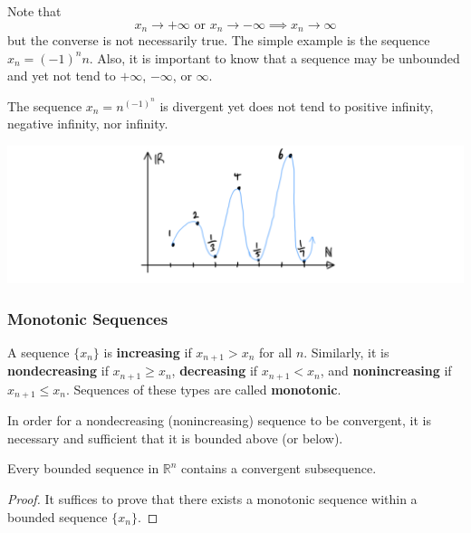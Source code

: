 \documentclass{article}
\begin{document}
      Note that 
      \[x_n \rightarrow +\infty \text{ or } x_n \rightarrow -\infty \implies x_n \rightarrow \infty\]
      but the converse is not necessarily true. The simple example is the sequence $x_n = (-1)^n n$. Also, it is important to know that a sequence may be unbounded and yet not tend to $+\infty$, $-\infty$, or $\infty$. 

      \begin{example}
        The sequence $x_n = n^{(-1)^n}$ is divergent yet does not tend to positive infinity, negative infinity, nor infinity. 
        \begin{center}
            \includegraphics[scale=0.25]{img/Neither_Divergent_Sequence.PNG}
        \end{center}
      \end{example}

    \subsubsection{Monotonic Sequences}

      \begin{definition}
        A sequence $\{x_n\}$ is \textbf{increasing} if $x_{n+1} > x_n$ for all $n$. Similarly, it is \textbf{nondecreasing} if $x_{n+1} \geq x_n$, \textbf{decreasing} if $x_{n+1} < x_n$, and \textbf{nonincreasing} if $x_{n+1} \leq x_n$. Sequences of these types are called \textbf{monotonic}. 
      \end{definition}


      \begin{lemma}
        In order for a nondecreasing (nonincreasing) sequence to be convergent, it is necessary and sufficient that it is bounded above (or below). 
      \end{lemma}

      \begin{theorem}
      Every bounded sequence in $\mathbb{R}^n$ contains a convergent subsequence. 
      \end{theorem} 
      \begin{proof}
      It suffices to prove that there exists a monotonic sequence within a bounded sequence $\{x_n\}$. 
      \end{proof}
\end{document}
